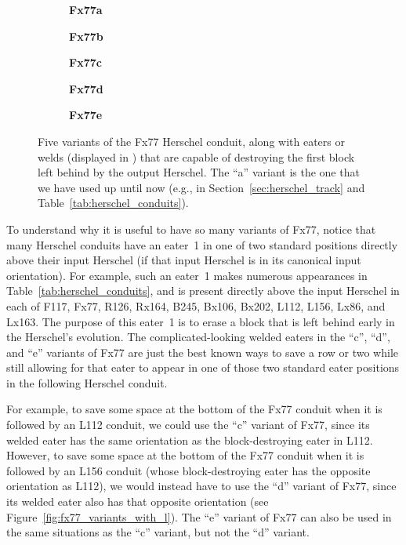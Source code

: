 \begin{figure}[!htb]
	\centering
	\begin{subfigure}{.18\textwidth}
		\centering
		\caption{\textbf{Fx77a}}
		\label{fig:fx77_a}
	\end{subfigure}\quad%
	\begin{subfigure}{.18\textwidth}
		\centering
		\caption{\textbf{Fx77b}}
		\label{fig:fx77_b}
	\end{subfigure}\quad%
	\begin{subfigure}{.18\textwidth}
		\centering
		\caption{\textbf{Fx77c}}
		\label{fig:fx77_c}
	\end{subfigure}\quad%
	\begin{subfigure}{.18\textwidth}
		\centering
		\caption{\textbf{Fx77d}}
		\label{fig:fx77_d}
	\end{subfigure}\quad%
	\begin{subfigure}{.18\textwidth}
		\centering
		\caption{\textbf{Fx77e}}
		\label{fig:fx77_e}
	\end{subfigure}
	\caption{Five variants of the Fx77 Herschel conduit, along with eaters or welds (displayed in ) that are capable of destroying the first block left behind by the output Herschel. The ``a'' variant is the one that we have used up until now (e.g., in Section~\ref{sec:herschel_track} and Table~\ref{tab:herschel_conduits}).}\label{fig:fx77_variants}
\end{figure}

To understand why it is useful to have so many variants of Fx77, notice that many Herschel conduits have an eater~1 in one of two standard positions directly above their input Herschel (if that input Herschel is in its canonical input orientation). For example, such an eater~1 makes numerous appearances in Table~\ref{tab:herschel_conduits}, and is present directly above the input Herschel in each of F117, Fx77, R126, Rx164, B245, Bx106, Bx202, L112, L156, Lx86, and Lx163. The purpose of this eater~1 is to erase a block that is left behind early in the Herschel's evolution. The complicated-looking welded eaters in the ``c'', ``d'', and ``e'' variants of Fx77 are just the best known ways to save a row or two while still allowing for that eater to appear in one of those two standard eater positions in the following Herschel conduit.

For example, to save some space at the bottom of the Fx77 conduit when it is followed by an L112 conduit, we could use the ``c'' variant of Fx77, since its welded eater has the same orientation as the block-destroying eater in L112. However, to save some space at the bottom of the Fx77 conduit when it is followed by an L156 conduit (whose block-destroying eater has the opposite orientation as L112), we would instead have to use the ``d'' variant of Fx77, since its welded eater also has that opposite orientation (see Figure~\ref{fig:fx77_variants_with_l}). The ``e'' variant of Fx77 can also be used in the same situations as the ``c'' variant, but not the ``d'' variant.

